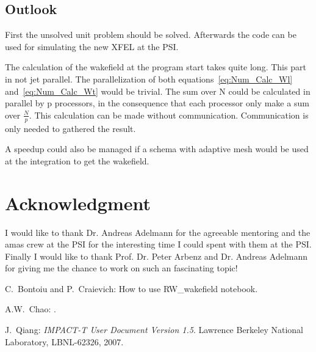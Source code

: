\documentclass[11pt,a4paper]{article}
\begin{document}
\subsection{Outlook}
First the unsolved unit problem should be solved. Afterwards the code
can be used for simulating the new XFEL at the PSI.

The calculation of the wakefield at the program start takes quite long.
This part in not jet parallel. The parallelization of both
equations~\eqref{eq:Num_Calc_Wl} and~\eqref{eq:Num_Calc_Wt} would be
trivial. The sum over N could be calculated in parallel by p processors,
in the consequence that each processor only make a sum over
$\frac{N}{p}$. This calculation can be made without communication.
Communication is only needed to gathered the result.

A speedup could also be managed if a schema with adaptive mesh would be
used at the integration to get the wakefield.

\section*{Acknowledgment}
I would like to thank Dr. Andreas Adelmann for the agreeable mentoring
and the amas crew at the PSI for the interesting time I could spent with
them at the PSI. Finally I would like to thank Prof. Dr. Peter Arbenz
and Dr. Andreas Adelmann for giving me the chance to work on such an
fascinating topic!



\begin{thebibliography}{9}
  
 C.~Bontoiu and P.~Craievich: How to use RW\_wakefield
  notebook.
  
 A.W.~Chao: .
   
 J.~Qiang: {\em IMPACT-T User Document Version 1.5}.
  Lawrence Berkeley National Laboratory, LBNL-62326, 2007.
 
\end{thebibliography}
\end{document}

